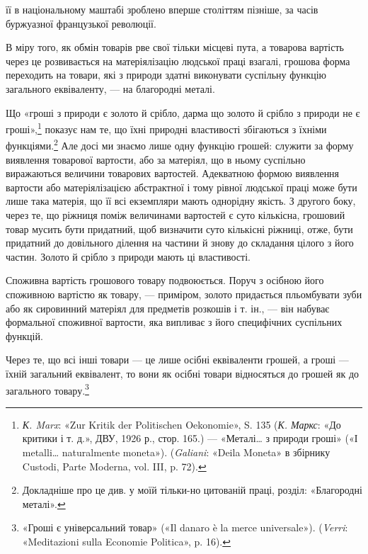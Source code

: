 \parcont{}  %
її в національному маштабі зроблено вперше століттям пізніше,
за часів буржуазної французької революції.

В міру того, як обмін товарів рве свої тільки місцеві пута,
а товарова вартість через це розвивається на матеріялізацію
людської праці взагалі, грошова форма переходить на товари,
які з природи здатні виконувати суспільну функцію загального
еквіваленту, — на благородні металі.

Що «гроші з природи є золото й срібло, дарма що золото й
срібло з природи не є гроші»,\footnote{
\emph{К. Marx}: «Zur Kritik der Politischen Oekonomie», S. 135 (\emph{К. Маркс}:
«До критики і т. д.», ДВУ, 1926 р., стор. 165.) — «Металі\dots{} з природи
гроші» («І metalli\dots{} naturalmente moneta»). (\emph{Galiani}: «Deila Moneta»
в збірнику Custodi, Parte Moderna, vol. III, p. 72).
} показує нам те, що їхні природні
властивості збігаються з їхніми функціями.\footnote{
Докладніше про це див. у моїй тільки-но цитованій праці, розділ:
«Благородні металі».
} Але досі
ми знаємо лише одну функцію грошей: служити за форму виявлення
товарової вартости, або за матеріял, що в ньому суспільно
виражаються величини товарових вартостей. Адекватною формою
виявлення вартости або матеріялізацією абстрактної і тому рівної
людської праці може бути лише така матерія, що її всі екземпляри
мають однорідну якість. З другого боку, через те, що ріжниця
поміж величинами вартостей є суто кількісна, грошовий товар
мусить бути придатний, щоб визначити суто кількісні ріжниці,
отже, бути придатний до довільного ділення на частини й знову
до складання цілого з його частин. Золото й срібло з природи
мають ці властивості.

Споживна вартість грошового товару подвоюється. Поруч з
осібною його споживною вартістю як товару, — приміром, золото
придається пльомбувати зуби або як сировинний матеріял
для предметів розкошів і т. ін., — він набуває формальної споживної
вартости, яка випливає з його специфічних суспільних
функцій.

Через те, що всі інші товари — це лише осібні еквіваленти
грошей, а гроші — їхній загальний еквівалент, то вони як осібні
товари відносяться до грошей як до загального товару.\footnote{
«Гроші є універсальний товар» («Il danaro è la merce universale»).
(\emph{Verri}: «Meditazioni sulla Economie Politica», p. 16).
}

